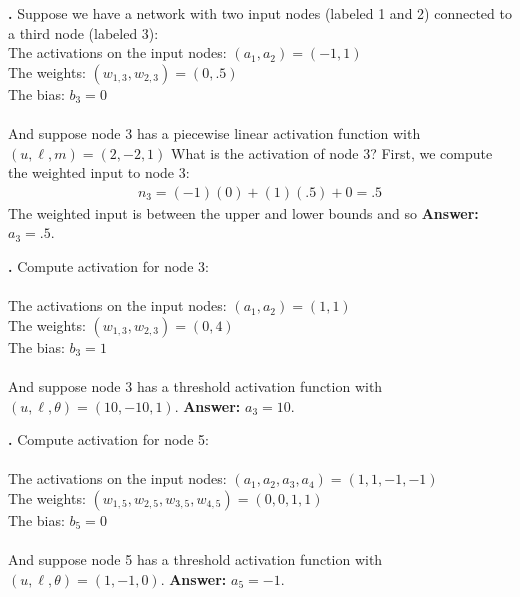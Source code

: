 \noindent
{\bf \theActFunctionCounter.} Suppose we have a network with
two input nodes (labeled 1 and 2) connected to a third node (labeled 3): \\
\indent \qquad\qquad The activations on the input nodes: $(a_1,a_2) = (-1,1)$\\
\indent \qquad\qquad The weights: $(w_{1,3}, w_{2,3}) = (0,.5)$ \\
\indent \qquad\qquad The bias: $b_3 = 0$ \\ \\
And suppose node 3 has a piecewise linear activation function with $(u,\ell,m) = (2,-2,1)$ What is the
activation of node 3?  First, we compute the weighted input to node 3:
\begin{eqnarray*}
n_3 =  (-1)(0)        +     (1)(.5)       + 0 = .5
\end{eqnarray*}
The weighted input is between the upper and lower bounds and so
{\bf Answer:}  $a_3=.5$.

\bigskip

\noindent
{\bf \theActFunctionCounter.} Compute activation for node 3: \\ \\
\indent \qquad\qquad The activations on the input nodes: $(a_1,a_2) = (1,1)$\\
\indent \qquad\qquad The weights: $(w_{1,3}, w_{2,3}) = (0,4)$ \\
\indent \qquad\qquad The bias: $b_3 = 1$ \\ \\
And suppose node 3 has a threshold activation function with $(u,\ell,\theta) = (10,-10,1)$.
{\bf Answer:}  $a_3=10$.

\bigskip

\noindent
{\bf \theActFunctionCounter.} Compute activation for node 5: \\ \\
\indent \qquad\qquad The activations on the input nodes: $(a_1,a_2, a_3, a_4) = (1,1,-1,-1)$\\
\indent \qquad\qquad The weights: $(w_{1,5}, w_{2,5}, w_{3,5}, w_{4,5}) = (0,0,1,1)$ \\
\indent \qquad\qquad The bias: $b_5 = 0$ \\ \\
And suppose node 5 has a threshold activation function with $(u,\ell,\theta) = (1,-1,0)$.
{\bf Answer:}  $a_5=-1$.

\bigskip

